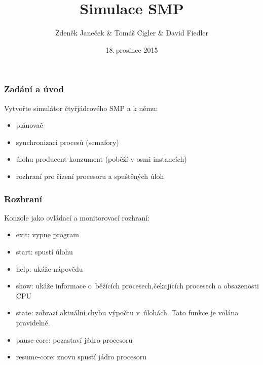 \documentclass{beamer}
\title{Simulace SMP}
\author{Zdeněk Janeček \& Tomáš Cigler \& David Fiedler}
\date{18.\,prosince 2015}
\begin{document}
\begin{frame} 
\titlepage
\end{frame}

\begin{frame} 
\frametitle{Zadání a úvod}
Vytvořte simulátor čtyřjádrového SMP a k němu:

\begin{itemize}
\item plánovač
\item synchronizaci procesů (semafory)
\item úlohu producent-konzument (poběží v osmi instancích)
\item rozhraní pro řízení procesoru a spuštěných úloh
\end{itemize}

\end{frame}

\begin{frame} 
\frametitle{Rozhraní}

Konzole jako ovládací a monitorovací rozhraní:

\begin{itemize}
\item exit: vypne program
\item start: spustí úlohu
\item help: ukáže nápovědu
\item show: ukáže informace o~běžících procesech,čekajících procesech a obsazenosti CPU
\item state: zobrazí aktuální chybu výpočtu v~úlohách. Tato funkce je volána pravidelně.
\item pause-core: pozastaví jádro procesoru
\item resume-core: znovu spustí jádro procesoru
\end{itemize}

\end{frame}
\end{document}
